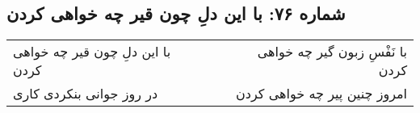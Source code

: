 \begin{center}
\section*{شماره ۷۶: با این دلِ چون قیر چه خواهی کردن}
\label{sec:076}
\begin{longtable}{l p{0.5cm} r}
با این دلِ چون قیر چه خواهی کردن
&&
با نَفْسِ زبون گیر چه خواهی کردن
\\
در روز جوانی بنکردی کاری
&&
امروز چنین پیر چه خواهی کردن
\\
\end{longtable}
\end{center}
